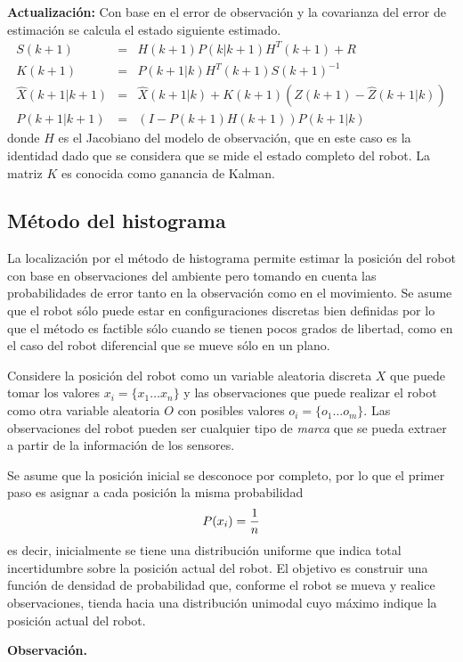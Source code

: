 \textbf{Actualización:} Con base en el error de observación y la covarianza del error de estimación se calcula el estado siguiente estimado.
\begin{eqnarray*}
	S(k+1) &=& H(k+1)P(k|k+1)H^T(k+1) + R\\
	K(k+1) &=& P(k+1|k)H^T(k+1)S(k+1)^{-1}\\
	\hat{X}(k+1|k+1) &=& \hat{X}(k+1|k) + K(k+1)(Z(k+1) - \hat{Z}(k+1|k))\\
	P(k+1|k+1) &=& (I-P(k+1)H(k+1))P(k+1|k)
\end{eqnarray*}
donde $H$ es el Jacobiano del modelo de observación, que en este caso es la identidad dado que se considera que se mide el estado completo del robot. La matriz $K$ es conocida como ganancia de Kalman.


\subsection{Método del histograma}
La localización por el método de histograma permite estimar la posición del robot con base en observaciones del ambiente pero tomando en cuenta las probabilidades de error tanto en la observación como en el movimiento. Se asume que el robot sólo puede estar en configuraciones discretas bien definidas por lo que el método es factible sólo cuando se tienen pocos grados de libertad, como en el caso del robot diferencial que se mueve sólo en un plano. 

Considere la posición del robot como un variable aleatoria discreta $X$ que puede tomar los valores $x_i=\{x_1 \dots x_n\}$ y las observaciones que puede realizar el robot como otra variable aleatoria $O$ con posibles valores $o_i=\{o_1 \dots o_m\}$. Las observaciones del robot pueden ser cualquier tipo de \textit{marca} que se pueda extraer a partir de la información de los sensores. 

Se asume que la posición inicial se desconoce por completo, por lo que el primer paso es asignar a cada posición la misma probabilidad
\begin{equation}
P(x_i) = \frac{\displaystyle 1}{\displaystyle n}
\end{equation}
es decir, inicialmente se tiene una distribución uniforme que indica total incertidumbre sobre la posición actual del robot. El objetivo es construir una función de densidad de probabilidad que, conforme el robot se mueva y realice observaciones, tienda hacia una distribución unimodal cuyo máximo indique la posición actual del robot.

\textbf{Observación.} 

